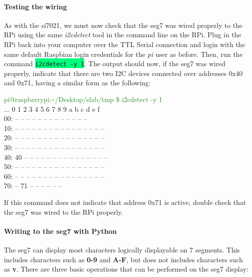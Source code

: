 \documentclass{article}
\newcommand*{\myfont}{\fontfamily{pcr}\selectfont}
\newcommand{\codei}[1]{\colorbox{SpringGreen}{\texttt{#1}}} %
\newcommand{\outputb}[2]{
  \begin{tcolorbox}[width=\textwidth,colback={light-gray},title={#1},colbacktitle=gray,coltitle=light-gray]
    \myfont
    #2
  \end{tcolorbox}
} %
\begin{document}
  \paragraph{Testing the wiring}
  As with the si7021, we must now check that the seg7 was wired properly to the RPi using the same \textit{i2cdetect} tool in the command line on the RPi. Plug in the RPi back into your computer over the TTL Serial connection and login with the same default Raspbian login credentials for the \textit{pi} user as before. Then, run the command \codei{i2cdetect -y 1}. The output should now, if the seg7 was wired properly, indicate that there are two I2C devices connected over addresses 0x40 and 0x71, having a similar form as the following:
  \outputb{I2C detection output (seg7 and si7021 both wired)}
 {
    \textcolor{ForestGreen}{pi@raspberrypi:\textasciitilde/Desktop/slab/tmp \$ i2cdetect -y 1} \\
    ...  0  1  2  3  4  5  6  7  8  9  a  b  c  d  e  f \\
    00:          -- -- -- -- -- -- -- -- -- -- -- -- -- \\
    10: -- -- -- -- -- -- -- -- -- -- -- -- -- -- -- -- \\
    20: -- -- -- -- -- -- -- -- -- -- -- -- -- -- -- -- \\
    30: -- -- -- -- -- -- -- -- -- -- -- -- -- -- -- -- \\
    40: 40 -- -- -- -- -- -- -- -- -- -- -- -- -- -- -- \\
    50: -- -- -- -- -- -- -- -- -- -- -- -- -- -- -- -- \\
    60: -- -- -- -- -- -- -- -- -- -- -- -- -- -- -- -- \\
    70: -- 71 -- -- -- -- -- --
  }
  If this command does not indicate that address 0x71 is active, double check that the seg7 was wired to the RPi properly.
  \paragraph{Writing to the seg7 with Python}
  The seg7 can display most characters logically displayable on 7 segments. This includes characters such as \textbf{0-9} and \textbf{A-F}, but does not includes characters such as \textbf{v}. There are three basic operations that can be performed on the seg7 display:
\end{document}
